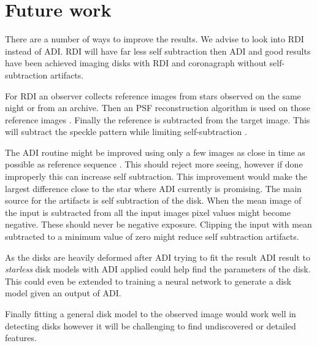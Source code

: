 \chapter{Future work}
\label{chap:future}


There are a number of ways to improve the results. We advise to look into \ac{RDI} instead of \ac{ADI}. \ac{RDI} will have far less self subtraction then \ac{ADI} and good results have been achieved imaging disks with \ac{RDI} and coronagraph \cite{rdi} without self-subtraction artifacts. 

For \ac{RDI} an observer collects reference images from stars observed on the same night or from an archive. Then an \ac{PSF} reconstruction algorithm is used on those reference images \cite{rdi}. Finally the reference is subtracted from the target image. This will subtract the speckle pattern while limiting self-subtraction \cite{rdi_2}.

The \ac{ADI} routine might be improved using only a few images as close in time as possible as reference sequence \cite{Marois_2006}. This should reject more seeing, however if done improperly this can increase self subtraction. This improvement would make the largest difference close to the star where \ac{ADI} currently is promising. The main source for the artifacts is self subtraction of the disk. When the mean image of the input is subtracted from all the input images pixel values might become negative. These should never be negative exposure. Clipping the input with mean subtracted to a minimum value of zero might reduce self subtraction artifacts.

As the disks are heavily deformed after \ac{ADI} trying to fit the result \ac{ADI} result to \textit{starless} disk models with \ac{ADI} applied could help find the parameters of the disk. This could even be extended to training a neural network to generate a disk model given an output of \ac{ADI}.

Finally fitting a general disk model to the observed image would work well in detecting disks however it will be challenging to find undiscovered or detailed features.
